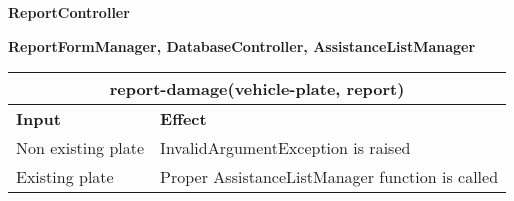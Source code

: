 \begin{Large}
\textbf{ReportController}
\end{Large}

\textbf{ReportFormManager, DatabaseController, AssistanceListManager} \\
\begin{tabular}{|p{5cm}|p{7cm}|}
\hline
\multicolumn{2}{|c|}{report-damage(vehicle-plate, report)} \\
\hline
\textbf{Input} & \textbf{Effect} \\

\hline
Non existing plate & InvalidArgumentException is raised \\

\hline
Existing plate & Proper AssistanceListManager function is called \\
\hline
\end{tabular}